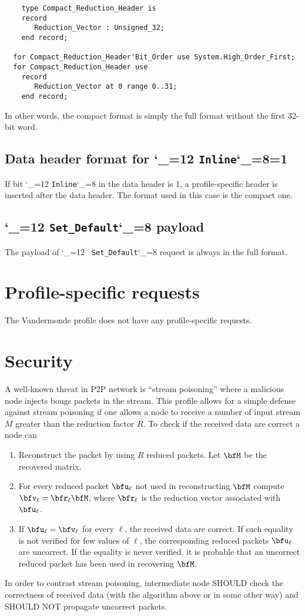 \documentclass{rfc}
\def\ttt{\catcode`\_=12 \tttii}
\def\tttii#1!{{\tt #1}\catcode`\_=8{}}
\begin{document}
\begin{verbatim}
    type Compact_Reduction_Header is
    record
       Reduction_Vector : Unsigned_32;
    end record;

  for Compact_Reduction_Header'Bit_Order use System.High_Order_First;
  for Compact_Reduction_Header use
    record
       Reduction_Vector at 0 range 0..31;
    end record;
\end{verbatim}
%
In other words, the compact format is simply the full format without
the first 32-bit word.

\subsection{Data header format for \ttt Inline!=1} 
If bit \ttt Inline! in the data header is 1, a profile-specific header
is inserted after the data header.  The format used in this case is
the compact one.

\subsection{\ttt Set\_Default! payload} The payload of \ttt
Set_Default! request is always in the full format.


\section{Profile-specific requests}
\label{sect:0.1.1.0;transport_layer}

The Vandermonde profile does not have any profile-specific requests.

\section{Security}
\label{sub:0.1.1.4;driver}

A well-known threat in P2P network is ``stream poisoning'' where a
malicious node injects bougs packets in the stream.  This profile
allows for a simple defense against stream poisoning if one allows a
node to receive a number of input stream $M$ greater than the
reduction factor $R$.  To check if the received data  are correct a
node can 

\begin{enumerate}
\item
  Reconstruct the packet by using $R$ reduced packets.  Let $\bfM$ be the
  recovered matrix.
\item
  For every reduced packet $\bfu_\ell$ not used in reconstructing
  $\bfM$ compute $\bfv_\ell = \bfr_\ell \bfM$, where $\bfr_\ell$ is
  the reduction vector associated with $\bfu_\ell$.
\item
  If $\bfu_\ell=\bfv_\ell$ for every $\ell$, the received data are
  correct.  If such equality is not verified for few values of $\ell$,
  the corresponding reduced packets $\bfu_\ell$ are uncorrect.  If the
  equality is never verified, it is probable that an uncorrect reduced
  packet has been used in recovering $\bfM$.
\end{enumerate}
%
In order to contrast stream poisoning, intermediate node SHOULD check
the correctness of received data (with the algorithm above or in some
other way) and SHOULD NOT propagate uncorrect packets.
\end{document}
